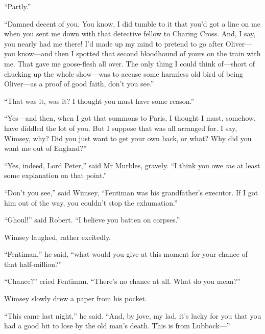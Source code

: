 \enquote{Partly.}

\enquote{Damned decent of you. You know, I did tumble to it that you'd got a line on me when you sent me down with that detective fellow to Charing Cross. And, I say, you nearly had me there! I'd made up my mind to pretend to go after Oliver\allowbreak---\allowbreak you know\allowbreak---\allowbreak and then I spotted that second bloodhound of yours on the train with me. That gave me goose-flesh all over. The only thing I could think of\allowbreak---\allowbreak short of chucking up the whole show\allowbreak---\allowbreak was to accuse some harmless old bird of being Oliver\allowbreak---\allowbreak as a proof of good faith, don't you see.}

\enquote{That was it, was it? I thought you must have some reason.}

\enquote{Yes\allowbreak---\allowbreak and then, when I got that summons to Paris, I thought I must, somehow, have diddled the lot of you. But I suppose that was all arranged for. I say, Wimsey, why? Did you just want to get your own back, or what? Why did you want me out of England?}

\enquote{Yes, indeed, Lord Peter,} said Mr Murbles, gravely. \enquote{I think you owe \textit{me} at least some explanation on that point.}

\enquote{Don't you see,} said Wimsey, \enquote{Fentiman was his grandfather's executor. If I got him out of the way, you couldn't stop the exhumation.}

\enquote{Ghoul!} said Robert. \enquote{I believe you batten on corpses.}

Wimsey laughed, rather excitedly.

\enquote{Fentiman,} he said, \enquote{what would you give at this moment for your chance of that half-million?}

\enquote{Chance?} cried Fentiman. \enquote{There's no chance at all. What do you mean?}

Wimsey slowly drew a paper from his pocket.

\enquote{This came last night,} he said. \enquote{And, by jove, my lad, it's lucky for you that you had a good bit to lose by the old man's death. This is from Lubbock---}


